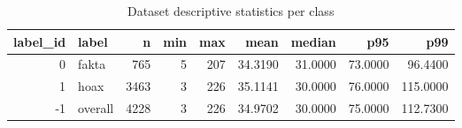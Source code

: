 \begin{table}
\caption{Dataset descriptive statistics per class}
\label{tab:eda_summary}
\begin{tabular}{rlrrrrrrr}
\toprule
label\_id & label & n & min & max & mean & median & p95 & p99 \\
\midrule
0 & fakta & 765 & 5 & 207 & 34.3190 & 31.0000 & 73.0000 & 96.4400 \\
1 & hoax & 3463 & 3 & 226 & 35.1141 & 30.0000 & 76.0000 & 115.0000 \\
-1 & overall & 4228 & 3 & 226 & 34.9702 & 30.0000 & 75.0000 & 112.7300 \\
\bottomrule
\end{tabular}
\end{table}
